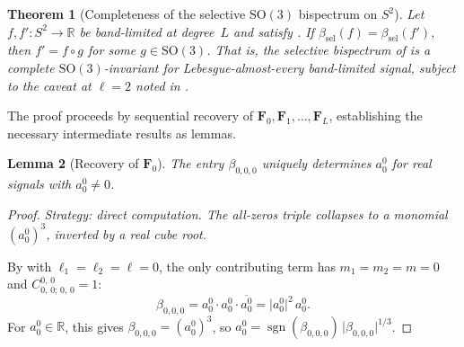 \documentclass{article}
\theoremstyle{plain}
\newtheorem{theorem}{Theorem}[section]
\newtheorem{lemma}[theorem]{Lemma}
\theoremstyle{definition}
\theoremstyle{remark}
\newcommand{\SO}{\mathrm{SO}}
\newcommand{\CG}[6]{C^{#5,\,#6}_{#1,\,#2;\,#3,\,#4}}
\newcommand{\abs}[1]{\lvert #1 \rvert}
\newcommand{\R}{\mathbb{R}}
\newcommand{\conj}[1]{\overline{#1}}
\DeclareMathOperator{\sgn}{sgn}
\begin{document}
\begin{theorem}[Completeness of the selective $\SO(3)$ bispectrum on $S^2$]
\label{thm:main}
Let $f, f' : S^2 \to \R$ be band-limited at degree~$L$ and satisfy
. If
$\beta_{\mathrm{sel}}(f) = \beta_{\mathrm{sel}}(f')$,
then $f' = f \circ g$ for some $g \in \SO(3)$. That is, the selective
bispectrum of  is a complete $\SO(3)$-invariant
for Lebesgue-almost-every band-limited signal, subject to the caveat
at $\ell = 2$ noted in .
\end{theorem}

The proof proceeds by sequential recovery of
$\mathbf{F}_0, \mathbf{F}_1, \dotsc, \mathbf{F}_L$, establishing the
necessary intermediate results as lemmas.

\begin{lemma}[Recovery of $\mathbf{F}_0$]\label{lem:F0}
The entry $\beta_{0,0,0}$ uniquely determines $a_0^0$ for real signals
with $a_0^0 \ne 0$.
\end{lemma}
\begin{proof}
\emph{Strategy: direct computation.
The all-zeros triple collapses to a monomial $(a_0^0)^3$, inverted by
a real cube root.}

By  with $\ell_1 = \ell_2 = \ell = 0$, the
only contributing term has $m_1 = m_2 = m = 0$ and
$\CG{0}{0}{0}{0}{0}{0} = 1$:
\begin{equation}\label{eq:beta000}
  \beta_{0,0,0}
  = a_0^0 \cdot a_0^0 \cdot \conj{a_0^0}
  = \abs{a_0^0}^2 \, a_0^0.
\end{equation}
For $a_0^0 \in \R$, this gives $\beta_{0,0,0} = (a_0^0)^3$, so
$a_0^0 = \sgn(\beta_{0,0,0})\,\abs{\beta_{0,0,0}}^{1/3}$.
\end{proof}
\end{document}

